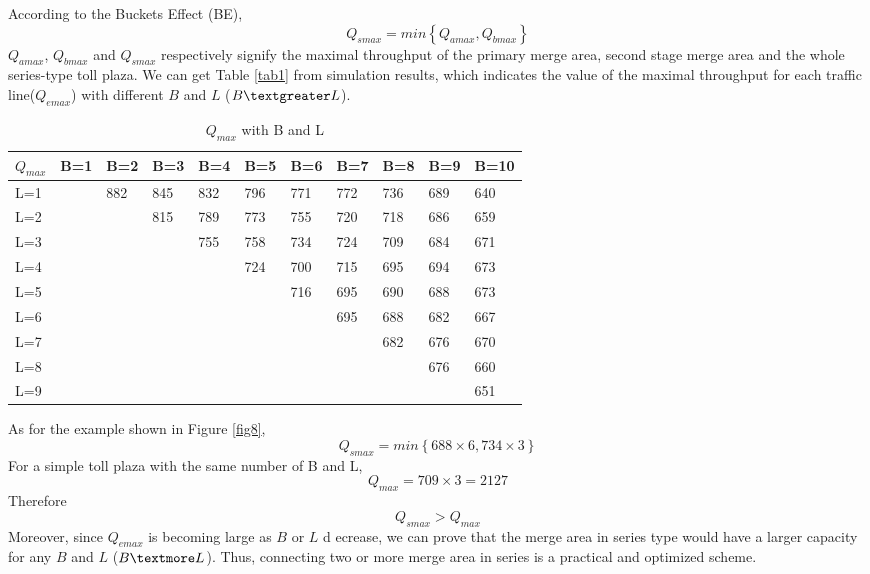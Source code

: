 \documentclass{mcmthesis}
\begin{document}
According to the Buckets Effect (BE),
$$Q_{smax}=min⁡\left\{ Q_{amax},Q_{bmax} \right\}$$
$Q_{amax}$, $Q_{bmax}$ and $Q_{smax}$ respectively
signify the
maximal throughput of the primary merge area,
second stage merge area and the whole series-type
toll plaza.
We can get Table \ref{tab1} from simulation results, which
indicates the value of the maximal throughput for
each traffic line($Q_{emax}$) with different
$B$ and $L$ ($B\textgreater L$).
\begin{table}[htbp]
  \centering
  \caption{$Q_{max}$ with B and L}\label{tab1}
    \begin{tabular}{lllllllllll}
    \toprule
    $Q_{max}$     & B=1   & B=2   & B=3   & B=4   & B=5   & B=6   & B=7   & B=8   & B=9   & B=10 \\
    \midrule
    L=1   &       & 882   & 845   & 832   & 796   & 771   & 772   & 736   & 689   & 640 \\
    L=2   &       &       & 815   & 789   & 773   & 755   & 720   & 718   & 686   & 659 \\
    L=3   &       &       &       & 755   & 758   & 734   & 724   & 709   & 684   & 671 \\
    L=4   &       &       &       &       & 724   & 700   & 715   & 695   & 694   & 673 \\
    L=5   &       &       &       &       &       & 716   & 695   & 690   & 688   & 673 \\
    L=6   &       &       &       &       &       &       & 695   & 688   & 682   & 667 \\
    L=7   &       &       &       &       &       &       &       & 682   & 676   & 670 \\
    L=8   &       &       &       &       &       &       &       &       & 676   & 660 \\
    L=9   &       &       &       &       &       &       &       &       &       & 651 \\
    \bottomrule
    \end{tabular}%
  \label{tab:addlabel}%
\end{table}%

As for the example shown in Figure \ref{fig8},
$$Q_{smax}=min⁡\left\{ 688\times6,734\times3 \right\}$$
For a simple toll plaza with the same number of B and L,
$$Q_{max}=709\times3=2127$$
Therefore
$$Q_{smax}>Q_{max}$$
Moreover, since $Q_{emax}$ is becoming large as $B$ or $L$ d
ecrease, we can prove that the merge area in series
type would have a larger capacity for any $B$ and $L$ ($B\textmore L$).
Thus, connecting two or more merge area in series is a
practical and optimized scheme.
\end{document}
